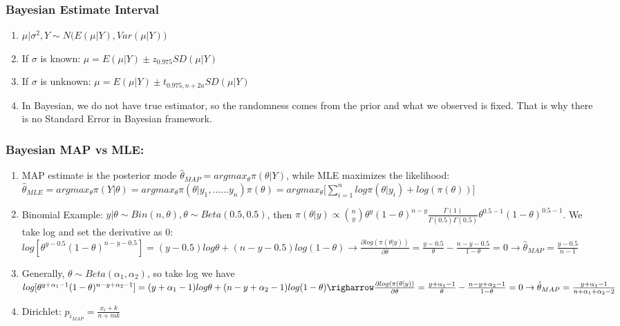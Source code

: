 \documentclass{beamer}
\begin{document}

\begin{frame}
\frametitle{Bayesian Estimate Interval}

\begin{enumerate}
\item $\mu|\sigma^2,Y \sim N\Big(E(\mu|Y),Var(\mu|Y)\Big)$ 

\item If $\sigma$ is known: $\mu = E(\mu|Y) \pm z_{0.975} SD(\mu|Y)$

\item If $\sigma$ is unknown: $\mu = E(\mu|Y) \pm t_{0.975,n+2a} SD(\mu|Y)$

\item In Bayesian, we do not have true estimator, so the randomness comes from the prior and what we observed is fixed. That is why there is no Standard Error in Bayesian framework.
\end{enumerate}

\end{frame}


\begin{frame}
\frametitle{Bayesian MAP vs MLE:}

\begin{enumerate}
\item MAP estimate is the posterior mode $\hat \theta_{MAP} = argmax_{\theta} \pi(\theta|Y)$, while MLE maximizes the likelihood: $\hat \theta_{MLE} = argmax_{\theta} \pi(Y|\theta) = argmax_{\theta} \pi(\theta|y_1,......y_n) \pi(\theta) = argmax_{\theta} \Big[\sum_{i=1}^n log\pi(\theta|y_i) + log(\pi(\theta))\Big]$  

\item Binomial Example: $y|\theta \sim Bin(n,\theta), \theta\sim Beta(0.5,0.5)$, then $\pi(\theta|y) \propto {{n}\choose{y}} \theta^{y} (1-\theta)^{n-y} \frac{\Gamma(1)}{\Gamma(0.5)\Gamma(0.5)} \theta^{0.5-1}(1-\theta)^{0.5-1}$. 
We take log and set the derivative as 0: $log[\theta^{y-0.5} (1-\theta)^{n-y-0.5}] = (y-0.5) log\theta + (n-y-0.5) log(1-\theta) \rightarrow \frac{\partial log(\pi(\theta|y))}{\partial \theta} = \frac{y-0.5}{\theta} - \frac{n-y-0.5}{1-\theta} = 0 \rightarrow \hat \theta_{MAP} = \frac{y-0.5}{n-1}$ 

\item Generally, $\theta \sim Beta(\alpha_1,\alpha_2)$, so take log we have $log[\theta^{y+\alpha_1 - 1} (1-\theta)^{n-y + \alpha_2-1}] = (y+\alpha_1-1) log\theta + (n-y+\alpha_2-1) log(1-\theta) \righarrow \frac{\partial log(\pi(\theta|y))}{\partial \theta} = \frac{y+\alpha_1 - 1}{\theta} - \frac{n-y + \alpha_2-1}{1-\theta} = 0 \rightarrow \hat \theta_{MAP} = \frac{y+\alpha_1 - 1}{n + \alpha_1 + \alpha_2 -2}$

\item Dirichlet: $\hat p_i_{MAP} = \frac{x_i + k}{n + mk}$

\end{enumerate}

\end{frame}
\end{document}
